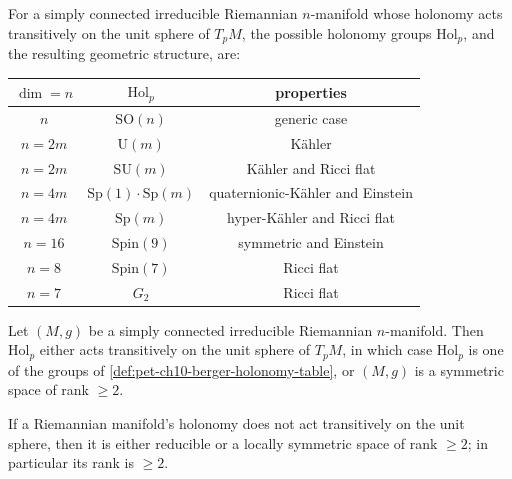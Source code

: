 \begin{definition}
  \label{def:pet-ch10-berger-holonomy-table}

  For a simply connected irreducible Riemannian $n$-manifold whose holonomy
  acts transitively on the unit sphere of $T_pM$, the possible holonomy groups
  $\mathrm{Hol}_p$, and the resulting geometric structure, are:
  \begin{center}
    \begin{tabular}{c|c|c}
      $\dim=n$ & $\mathrm{Hol}_p$ & properties \\\hline
      $n$ & $\mathrm{SO}(n)$ & generic case \\
      $n=2m$ & $\mathrm U(m)$ & Kähler \\
      $n=2m$ & $\mathrm{SU}(m)$ & Kähler and Ricci flat \\
      $n=4m$ & $\mathrm{Sp}(1)\cdot\mathrm{Sp}(m)$ & quaternionic-Kähler and Einstein \\
      $n=4m$ & $\mathrm{Sp}(m)$ & hyper-Kähler and Ricci flat \\
      $n=16$ & $\mathrm{Spin}(9)$ & symmetric and Einstein \\
      $n=8$ & $\mathrm{Spin}(7)$ & Ricci flat \\
      $n=7$ & $G_2$ & Ricci flat
    \end{tabular}
  \end{center}
\end{definition}

\begin{theorem}
  \label{thm:pet-ch10-berger-simons-classification}

  Let $(M,g)$ be a simply connected irreducible Riemannian $n$-manifold. Then
  $\mathrm{Hol}_p$ either acts transitively on the unit sphere of $T_pM$, in
  which case $\mathrm{Hol}_p$ is one of the groups of
  \cref{def:pet-ch10-berger-holonomy-table}, or $(M,g)$ is a symmetric space of
  rank $\ge2$.
\end{theorem}

\begin{corollary}
  \label{cor:pet-ch10-nontransitive-holonomy}

  If a Riemannian manifold's holonomy does not act transitively on the unit
  sphere, then it is either reducible or a locally symmetric space of rank
  $\ge2$; in particular its rank is $\ge2$.
\end{corollary}

